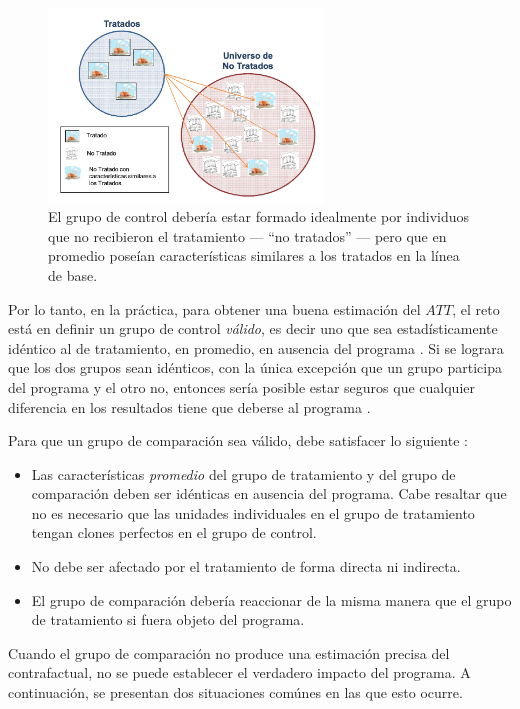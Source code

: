 \documentclass[../../main.tex]{subfiles}
\begin{document}
\begin{figure}[ht]
    \centering
    \includegraphics[width=0.65\textwidth]{figs/grupo-de-control.png}
    \caption{El grupo de control debería estar formado idealmente por individuos que no
    recibieron el tratamiento — ``no tratados'' — pero que en promedio poseían
    características similares a los tratados en la línea de base.}
    \label{fig:control-group}
\end{figure}

Por lo tanto, en la práctica, para obtener una buena estimación del \(ATT\), el reto está
en definir un grupo de control \textit{válido}, es decir uno que sea estadísticamente
idéntico al de tratamiento, en promedio, en ausencia del programa \cite{gertler-2016}. Si
se lograra que los dos grupos sean idénticos, con la única excepción que un grupo
participa del programa y el otro no, entonces sería posible estar seguros que cualquier
diferencia en los resultados tiene que deberse al programa \cite{gertler-2016}.

Para que un grupo de comparación sea válido, debe satisfacer lo siguiente \cite{gertler-2016}:
\begin{itemize}
    \item Las características \textit{promedio} del grupo de tratamiento y del grupo de
    comparación deben ser idénticas en ausencia del programa. Cabe resaltar que no es
    necesario que las unidades individuales en el grupo de tratamiento tengan clones
    perfectos en el grupo de control.
    \item No debe ser afectado por el tratamiento de forma directa ni indirecta.
    \item El grupo de comparación debería reaccionar de la misma manera que el grupo de
    tratamiento si fuera objeto del programa.
\end{itemize}

Cuando el grupo de comparación no produce una estimación precisa del contrafactual, no se
puede establecer el verdadero impacto del programa. A continuación, se presentan dos
situaciones comúnes en las que esto ocurre.
\end{document}
